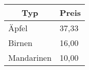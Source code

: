 \documentclass{article}
\begin{document}
  \begin{tabular}{|ll|}
      \hline
      \multicolumn{1}{|c}{\textbf{Typ}}
      & \multicolumn{1}{c|}{\textbf{Preis}} \\
      \hline
      Äpfel & 37,33 \\
      Birnen & 16,00 \\
      Mandarinen & 10,00 \\
      \hline
  \end{tabular}
\end{document}
